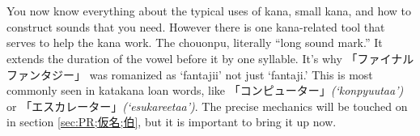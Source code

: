 \section[長音符]{}\label{sec:PR;仮名;長音符}

You now know everything about the typical uses of kana, small kana, and how to construct sounds that you need. However there is one kana-related tool that serves to help the kana work. The chouonpu, literally ``long sound mark.'' It extends the duration of the vowel before it by one syllable. It's why 「ファイナルファンタジー」 was romanized as `fantajii' not just `fantaji.' This is most commonly seen in katakana loan words, like 「コンピューター」\textit{(`konpyuutaa')} or 「エスカレーター」\textit{(`esukareetaa')}. The precise mechanics will be touched on in section \ref{sec:PR;仮名;伯}, but it is important to bring it up now.
